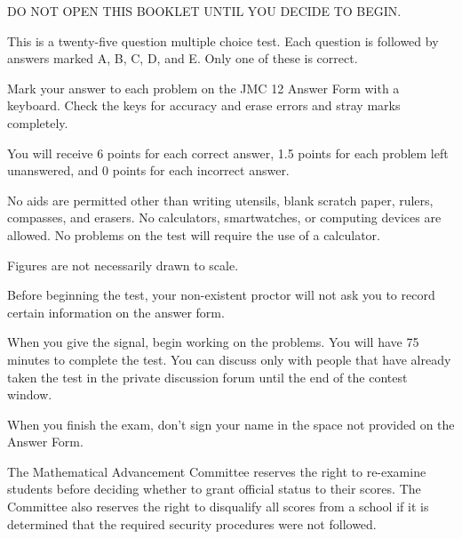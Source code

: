 \documentclass[10pt, twoside]{article}
\newcommand{\contestNumber}{12}
\begin{document}
\begin{justify}
\begin{enumerate}[noitemsep, nolistsep, leftmargin=*]

\small{
\item DO NOT OPEN THIS BOOKLET UNTIL YOU DECIDE TO BEGIN.
\item This is a twenty-five question multiple choice test. Each question is followed by answers marked A, B, C, D, and E. Only one of these is correct.
\item Mark your answer to each problem on the JMC {\contestNumber} Answer Form with a keyboard. Check the keys for accuracy and erase errors and stray marks completely.
\item You will receive 6 points for each correct answer, 1.5 points for each problem left unanswered, and 0 points for each incorrect answer.
\item No aids are permitted other than writing utensils, blank scratch paper, rulers, compasses, and erasers. No calculators, smartwatches, or computing devices are allowed. No problems on the test will require the use of a calculator.
\item Figures are not necessarily drawn to scale.
\item Before beginning the test, your non-existent proctor will not ask you to record certain information on the answer form. 
\item When you give the signal, begin working on the problems. You will have 75 minutes to complete the test. You can discuss only with people that have already taken the test in the private discussion forum until the end of the contest window.
\item When you finish the exam, don't sign your name in the space not provided on the Answer Form.
}

\end{enumerate}

\vspace{-4mm}

\begin{center} \noindent\hrulefill \end{center}

\vspace{-5mm}

\small{
\begin{justify}
The Mathematical Advancement Committee reserves the right to re-examine students before deciding whether to grant official status to their scores. The Committee also reserves the right to disqualify all scores from a school if it is determined that the required security procedures were not followed.
\end{justify}

}
\end{justify}
\end{document}
